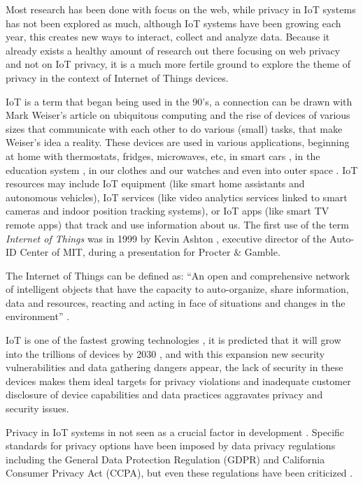 \documentclass[conference]{IEEEtran}
\begin{document}
Most research has been done with focus on the web, while privacy in IoT
systems has not been explored as much, although IoT systems have been
growing each year, this creates new ways to interact,
collect and analyze data.
Because it already exists a healthy amount of research out there
focusing on web privacy and not on IoT privacy, it is a much more
fertile ground to explore the theme of privacy in the context of
Internet of Things devices.

IoT is a term that began being used in the 90's, a connection can be drawn
with Mark Weiser's article on ubiquitous computing \cite{weiser1991computer} and the rise
of devices of various sizes that communicate with each other to do
various (small) tasks, that make Weiser's idea a reality. These devices are
used in various applications, beginning at home \cite{marikyan2019systematic} with thermostats,
fridges, microwaves, etc, in smart cars \cite{arena2020overview}, in the education system \cite{al2020survey},
in our clothes and our watches \cite{niknejad2020comprehensive} and even into outer space \cite{AkyildizInternet}.
IoT resources may include IoT equipment (like smart home assistants and
autonomous vehicles), IoT services (like video analytics services linked to
smart cameras and indoor position tracking systems), or IoT apps
(like smart TV remote apps) that track and use information about us.
The first use of the term \textit{Internet of Things} was in 1999 by Kevin Ashton \cite{KevinThat},
executive director of the Auto-ID Center of MIT, during a presentation for Procter \& Gamble.

The Internet of Things can be defined as: ``An open and
comprehensive network of intelligent objects that have the capacity to auto-organize,
share information, data and resources, reacting and acting in face of situations
and changes in the environment'' \cite{madakam2015internet}.

IoT is one of the fastest growing technologies \cite{MohammadState},
it is predicted that it will grow into the trillions of devices by 2030 \cite{SarawiInternet},
and with this expansion new security vulnerabilities and data gathering dangers appear, the lack
of security in these devices makes them ideal targets for privacy violations and inadequate
customer disclosure of device capabilities and data practices aggravates
privacy and security issues.

Privacy in IoT systems in not seen as a crucial factor in development \cite{alhirabi2021security}.
Specific standards for privacy options have been imposed by
data privacy regulations including the General Data Protection Regulation (GDPR)
and California Consumer Privacy Act (CCPA), but even these regulations have
been criticized \cite{peloquin2020disruptive, gladis2022weaponizing, gentile2022deficient, green2022flaws, byun2019privacy}.
\end{document}
